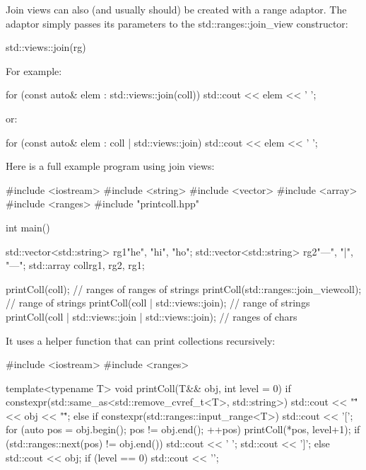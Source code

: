 
Join views can also (and usually should) be created with a range adaptor. The adaptor simply passes its parameters to the std::ranges::join\_view constructor:

\begin{cpp}
std::views::join(rg)
\end{cpp}

For example:

\begin{cpp}
for (const auto& elem : std::views::join(coll)) {
	std::cout << elem << ' ';
}
\end{cpp}

or:

\begin{cpp}
for (const auto& elem : coll | std::views::join) {
	std::cout << elem << ' ';
}
\end{cpp}

Here is a full example program using join views:


\begin{cpp}
#include <iostream>
#include <string>
#include <vector>
#include <array>
#include <ranges>
#include "printcoll.hpp"

int main()
{
	std::vector<std::string> rg1{"he", "hi", "ho"};
	std::vector<std::string> rg2{"---", "|", "---"};
	std::array coll{rg1, rg2, rg1};
	
	printColl(coll); // ranges of ranges of strings
	printColl(std::ranges::join_view{coll}); // range of strings
	printColl(coll | std::views::join); // range of strings
	printColl(coll | std::views::join | std::views::join); // ranges of chars
}
\end{cpp}

It uses a helper function that can print collections recursively:


\begin{cpp}
#include <iostream>
#include <ranges>

template<typename T>
void printColl(T&& obj, int level = 0)
{
	if constexpr(std::same_as<std::remove_cvref_t<T>, std::string>) {
		std::cout << "\"" << obj << "\"";
	}
	else if constexpr(std::ranges::input_range<T>) {
		std::cout << '[';
		for (auto pos = obj.begin(); pos != obj.end(); ++pos) {
			printColl(*pos, level+1);
			if (std::ranges::next(pos) != obj.end()) {
				std::cout << ' ';
			}
		}
		std::cout << ']';
	}
	else {
		std::cout << obj;
	}
	if (level == 0) std::cout << '\n';
}
\end{cpp}


